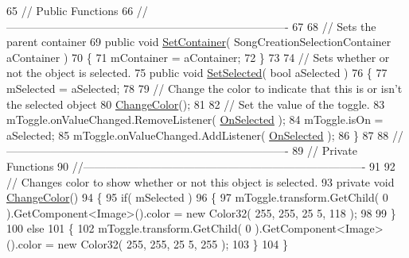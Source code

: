 \begin{DoxyCodeInclude}
65             \textcolor{comment}{// Public Functions}
66             \textcolor{comment}{//---------------------------------------------------------------------------- }
67 
68             \textcolor{comment}{// Sets the parent container}
69             \textcolor{keyword}{public} \textcolor{keywordtype}{void} \hyperlink{group___s_c_m_nest_class_a29f496763424eb274f35cd29330583ac}{SetContainer}( SongCreationSelectionContainer aContainer )
70             \{
71                 mContainer = aContainer;
72             \}
73 
74             \textcolor{comment}{// Sets whether or not the object is selected.}
75             \textcolor{keyword}{public} \textcolor{keywordtype}{void} \hyperlink{group___s_c_m_nest_class_a0d65cd109a370034f580d63e823725b9}{SetSelected}( \textcolor{keywordtype}{bool} aSelected )
76             \{
77                 mSelected = aSelected;
78 
79                 \textcolor{comment}{// Change the color to indicate that this is or isn't the selected object}
80                 \hyperlink{group___s_c_m_nest_class_a26bd7667a86c8dc85429a5e4798dd30a}{ChangeColor}();
81 
82                 \textcolor{comment}{// Set the value of the toggle.}
83                 mToggle.onValueChanged.RemoveListener( \hyperlink{group___s_c_m_nest_class_a6477d6c5056af7998063e90e282b67ae}{OnSelected} );
84                 mToggle.isOn = aSelected;
85                 mToggle.onValueChanged.AddListener( \hyperlink{group___s_c_m_nest_class_a6477d6c5056af7998063e90e282b67ae}{OnSelected} );
86             \}
87 
88             \textcolor{comment}{//---------------------------------------------------------------------------- }
89             \textcolor{comment}{// Private Functions}
90             \textcolor{comment}{//---------------------------------------------------------------------------- }
91 
92             \textcolor{comment}{// Changes color to show whether or not this object is selected.}
93             \textcolor{keyword}{private} \textcolor{keywordtype}{void} \hyperlink{group___s_c_m_nest_class_a26bd7667a86c8dc85429a5e4798dd30a}{ChangeColor}()
94             \{
95                 \textcolor{keywordflow}{if}( mSelected )
96                 \{
97                     mToggle.transform.GetChild( 0 ).GetComponent<Image>().color = \textcolor{keyword}{new} Color32( 255, 255, 25
      5, 118 );
98 
99                 \}
100                 \textcolor{keywordflow}{else}
101                 \{
102                     mToggle.transform.GetChild( 0 ).GetComponent<Image>().color = \textcolor{keyword}{new} Color32( 255, 255, 25
      5, 255 );
103                 \}
104             \}

\end{DoxyCodeInclude}
